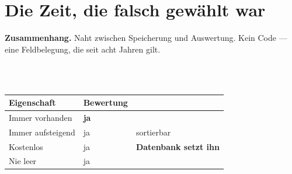 \chapter{Die Zeit, die falsch gewählt war}\label{fall:zeit}

\begin{merksatz}
\textbf{Zusammenhang.} Naht zwischen Speicherung und Auswertung. Kein Code --- eine Feldbelegung, die seit acht Jahren gilt.

\begin{center}
\begin{minipage}{0.9\textwidth}
\ \ \ \ \ \\
\code{}\ \ \ \ \ \ \ \ \ \ \ \ \ \ \ \ \ \ \ \ \ \ \ 
\end{minipage}
\end{center}

\begin{center}
\renewcommand{\arraystretch}{1.45}
\begin{tabular}{@{}P{3.0cm}P{2.2cm}P{2.6cm}@{}}
\toprule
\textbf{Eigenschaft} & \textbf{Bewertung} & \\
\midrule
Immer vorhanden & \textcolor{gruen}{\textbf{ja}} & \\
Immer aufsteigend & \textcolor{gruen}{ja} & \textcolor{gruen}{sortierbar}\\
Kostenlos & \textcolor{gruen}{ja} & \textbf{Datenbank setzt ihn}\\
Nie leer & \textcolor{gruen}{ja} & \\
\bottomrule
\end{tabular}
\end{center}

\begin{center}
\begin{minipage}{0.88\textwidth}
\end{minipage}
\end{center}
\end{merksatz}

